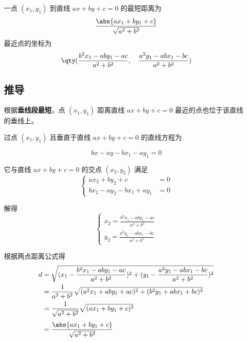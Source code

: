 
\begin{issues}
\issueDraft
\end{issues}

一点 $(x_1,y_1)$ 到直线 $ax + by + c = 0$ 的最短距离为
\begin{equation}
\frac{\abs{ax_1 + by_1 + c}}{\sqrt{a^2 + b^2}}
\end{equation}
最近点的坐标为
\begin{equation}
\qty(
\frac{b^2x_1 - aby_1 - ac}{a^2 + b^2}, \quad
\frac{a^2y_1 - abx_1 - bc}{a^2 + b^2})
\end{equation}

\subsection{推导}

根据\textbf{垂线段最短}，点 $(x_1, y_1)$ 距离直线 $ax + by + c = 0$ 最近的点也位于该直线的垂线上。

过点 $(x_1, y_1)$ 且垂直于直线 $ax+by+c=0$ 的直线方程为

\begin{equation}
bx - ay - bx_1 - ay_1 = 0
\end{equation}

它与直线 $ax + by + c = 0$ 的交点 $(x_2, y_2)$ 满足
\begin{equation}
\left\lbrace
\begin{aligned}
ax_2 + by_2 + c &= 0\\
bx_2 - ay_2-bx_1 + ay_1 &= 0
\end{aligned}
\right.
\end{equation}

解得
\begin{equation}
\left\lbrace
\begin{aligned}
x_2=\frac{b^2x_1 - aby_1 - ac}{a^2 + b^2}\\
y_2=\frac{a^2y_1 - abx_1 - bc}{a^2 + b^2}
\end{aligned}
\right.
\end{equation}

根据两点距离公式得
\begin{equation}
\begin{split}
d&=\sqrt{(x_1-\frac{b^2x_1 - aby_1 - ac}{a^2 + b^2})^2 + (y_1-\frac{a^2y_1 - abx_1 - bc}{a^2 + b^2})^2}\\
&=\frac{1}{a^2 + b^2}\sqrt{(a^2x_1 + aby_1 + ac)^2 + (b^2y_1 + abx_1 + bc)^2}\\
&=\frac{1}{\sqrt{a^2 + b^2}}\sqrt{(ax_1 + by_1 + c)^2}\\[3pt]
&=\frac{\abs{ax_1 + by_1 + c}}{\sqrt{a^2 + b^2}}\\
\end{split}
\end{equation}


